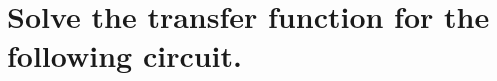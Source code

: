 \documentclass[main.tex]{subfiles}
\begin{document}
\section{Solve the transfer function for the following circuit.}


\end{document}
